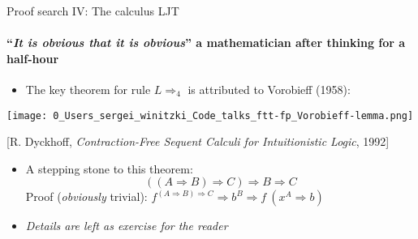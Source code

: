 \documentclass[english]{beamer}
\begin{document}
\begin{frame}{Proof search IV: The calculus LJT}


\framesubtitle{``\emph{It is obvious that it is obvious}'' \textendash{} a mathematician
after thinking for a half-hour}
\begin{itemize}
\item The key theorem for rule $L\Rightarrow_{4}$ is attributed to Vorobieff
(1958):
\end{itemize}
\begin{center}
\texttt{[image: 0\_Users\_sergei\_winitzki\_Code\_talks\_ftt-fp\_Vorobieff-lemma.png]}
\par\end{center}

\begin{center}
{\footnotesize{}{[}R. Dyckhoff, }\emph{\footnotesize{}Contraction-Free
Sequent Calculi for Intuitionistic Logic}{\footnotesize{}, 1992{]}}
\par\end{center}{\footnotesize \par}
\begin{itemize}
\item A stepping stone to this theorem:
\[
\left(\left(A\Rightarrow B\right)\Rightarrow C\right)\Rightarrow B\Rightarrow C
\]
Proof (\emph{obviously} trivial): $f^{\left(A\Rightarrow B\right)\Rightarrow C}\Rightarrow b^{B}\Rightarrow f\:(x^{A}\Rightarrow b)$
\item \emph{Details are left as exercise for the reader}
\end{itemize}
\end{frame}
\end{document}
